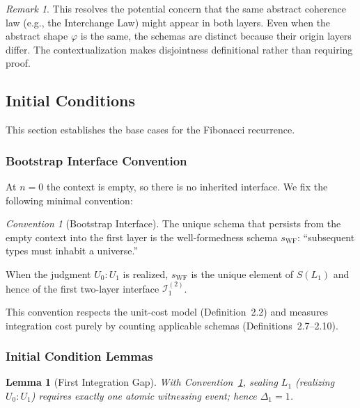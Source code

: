 \documentclass[11pt]{article}
\newtheorem{lemma}[theorem]{Lemma}
\theoremstyle{definition}
\theoremstyle{remark}
\newtheorem{remark}[theorem]{Remark}
\newtheorem{convention}[theorem]{Convention}
\begin{document}
\begin{remark}
This resolves the potential concern that the same abstract coherence law (e.g., the Interchange
Law) might appear in both layers. Even when the abstract shape $\varphi$ is the same, the schemas
are distinct because their origin layers differ. The contextualization makes disjointness definitional
rather than requiring proof.
\end{remark}

\subsection{Initial Conditions}
\label{app:initial-conditions}

This section establishes the base cases for the Fibonacci recurrence.

\subsubsection{Bootstrap Interface Convention}

At $n=0$ the context is empty, so there is no inherited interface. We fix the following minimal
convention:

\begin{convention}[Bootstrap Interface]
\label{conv:bootstrap}
The unique schema that persists from the empty context into the first layer is the well-formedness
schema $s_{\text{WF}}$: ``subsequent types must inhabit a universe.''

When the judgment $U_0 : U_1$ is realized, $s_{\text{WF}}$ is the unique element of $S(L_1)$ and hence of
the first two-layer interface $\mathcal{I}_1^{(2)}$.
\end{convention}

This convention respects the unit-cost model (Definition~2.2) and measures integration cost purely
by counting applicable schemas (Definitions~2.7--2.10).

\subsubsection{Initial Condition Lemmas}

\begin{lemma}[First Integration Gap]
\label{lem:delta-one}
With Convention~\ref{conv:bootstrap}, sealing $L_1$ (realizing $U_0 : U_1$) requires exactly one
atomic witnessing event; hence $\Delta_1 = 1$.
\end{lemma}
\end{document}
